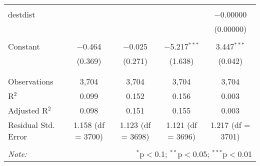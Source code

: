 \begin{table}[!htbp]
\begin{tabular}{@{\extracolsep{5pt}}lcccc}
  & & & & \\ 
 destdist &  &  &  & $-$0.00000 \\ 
  &  &  &  & (0.00000) \\ 
  & & & & \\ 
 Constant & $-$0.464 & $-$0.025 & $-$5.217$^{***}$ & 3.447$^{***}$ \\ 
  & (0.369) & (0.271) & (1.638) & (0.042) \\ 
  & & & & \\ 
\hline \\[-1.8ex] 
Observations & 3,704 & 3,704 & 3,704 & 3,704 \\ 
R$^{2}$ & 0.099 & 0.152 & 0.156 & 0.003 \\ 
Adjusted R$^{2}$ & 0.098 & 0.151 & 0.155 & 0.003 \\ 
Residual Std. Error & 1.158 (df = 3700) & 1.123 (df = 3698) & 1.121 (df = 3696) & 1.217 (df = 3701) \\ 
\hline 
\hline \\[-1.8ex] 
\textit{Note:}  & \multicolumn{4}{r}{$^{*}$p$<$0.1; $^{**}$p$<$0.05; $^{***}$p$<$0.01} \\ 
\end{tabular} 
\end{table} 
